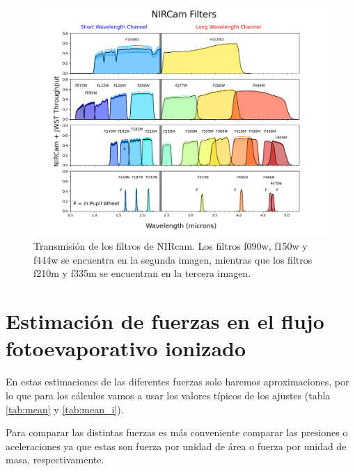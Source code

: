 \documentclass{book}
\begin{document}
\begin{figure}
    \centering
    \includegraphics[width=\textwidth]{Appendices/multi_filter_plot_per_detector_May2024.png}
    \caption{Transmisión de los filtros de NIRcam. Los filtros f090w,
      f150w y f444w se encuentra en la segunda imagen, mientras que
      los filtros f210m y f335m se encuentran en la tercera imagen.}
    \label{fig:filtros JWST}
\end{figure}

\chapter{Estimación de fuerzas en el flujo fotoevaporativo ionizado} \label{App:fuerzas}

En estas estimaciones de las diferentes fuerzas solo haremos
aproximaciones, por lo que para los cálculos vamos a usar los valores
típicos de los ajustes (tabla \ref{tab:mean} y \ref{tab:mean_i}).

Para comparar las distintas fuerzas es más conveniente comparar las
presiones o aceleraciones ya que estas son fuerza por unidad de área o
fuerza por unidad de masa, respectivamente.
\end{document}
